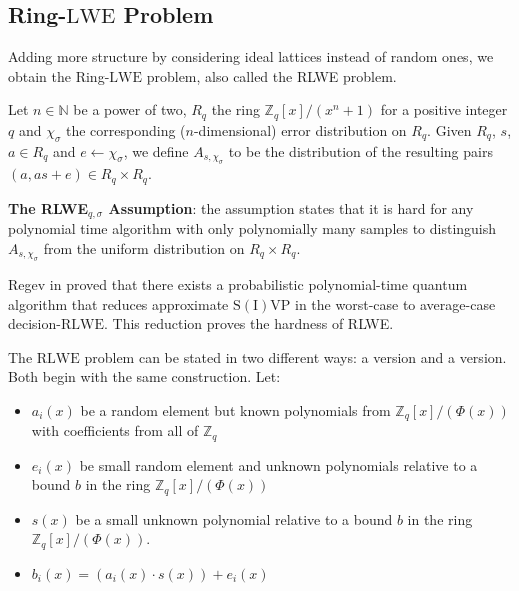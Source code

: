 \subsection{Ring-\texorpdfstring{$\mathrm{LWE}$}{LWE} Problem}
Adding more structure by considering ideal lattices instead of random ones, we obtain the Ring-$\mathrm{LWE}$ problem, also called the RLWE problem.

Let $n \in \mathbb{N}$ be a power of two, $R_{q}$ the ring $\mathbb{Z}_{q}[x]/(x^n + 1)$ for a positive integer $q$ and $\chi_{\sigma}$ the corresponding ($n$-dimensional) error distribution on $R_{q}$. Given $R_{q}$, $s$, $a \in R_{q}$ and $e \leftarrow \chi_{\sigma}$, we define $A_{s, \chi_{\sigma}}$ to be the distribution of the resulting pairs $(a, a s + e) \in R_{q} \times R_{q}$.


\textbf{The RLWE$_{q,\sigma}$ Assumption}:  the assumption states that it is hard for any polynomial time algorithm with only polynomially many samples to distinguish $A_{s,\chi_{\sigma}}$ from the uniform distribution on $R_q \times R_q$.

Regev in \cite{cryptoeprint:2012:230} proved that there exists a probabilistic polynomial-time quantum algorithm that reduces approximate $\mathrm{S(I)VP}$ in the worst-case to average-case decision-$\mathrm{RLWE}$. This reduction proves the hardness of RLWE.


The $\mathrm{RLWE}$ problem can be stated in two different ways: a  version and a  version. Both begin with the same construction. Let:

\begin{itemize}
    \item $a_{i}(x)$ be a random element but known polynomials from $\mathbb{Z} _{q}[x]/ (\Phi (x))$ with coefficients from all of $\mathbb{Z}_q$
    
    \item $e_{i}(x)$ be small random element and unknown polynomials relative to a bound $b$ in the ring $\mathbb {Z} _{q}[x]/ (\Phi (x))$
    
    \item $s(x)$ be a small unknown polynomial relative to a bound $b$ in the ring $\mathbb{Z}_{q}[x]/ (\Phi (x))$.
    
    \item $b_{i}(x)=(a_{i}(x)\cdot s(x))+e_{i}(x)$
\end{itemize}


